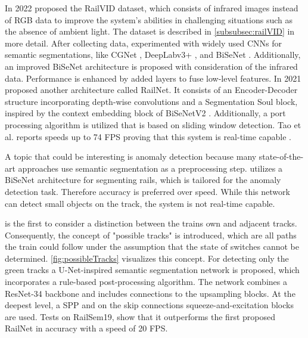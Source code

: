 In 2022 \cite{yuan2022railvid} proposed the RailVID dataset, which consists of infrared images instead of \ac{RGB} data to improve the system's abilities in challenging situations such as the absence of ambient light.
The dataset is described in \autoref{subsubsec:railVID} in more detail.
After collecting data, \cite{yuan2022railvid} experimented with widely used \ac{CNN}s for semantic segmentations, like \ac{CGNet} \cite{CGNet}, DeepLabv3+ \cite{DeepLabV3plus2018}, and \ac{BiSeNet} \cite{BiSeNet2019}.
Additionally, an improved BiSeNet architecture is proposed with consideration of the infrared data. Performance is enhanced by added layers to fuse low-level features.
In 2021 \cite{AccurateLightweightRailNet2021} proposed another architecture called RailNet.
It consists of an Encoder-Decoder structure incorporating depth-wise convolutions and a Segmentation Soul block, inspired by the context embedding block of \ac{BiSeNet}V2 \cite{BiSeNetV22021}.
Additionally, a port processing algorithm is utilized that is based on sliding window detection.
Tao et al. reports speeds up to 74 \ac{FPS} proving that this system is real-time capable \cite{AccurateLightweightRailNet2021}.

A topic that could be interesting is anomaly detection because many state-of-the-art approaches use semantic segmentation as a preprocessing step.
\cite{anomalyDetection2021} utilizes a \ac{BiSeNet} \cite{BiSeNet2019} architecture for segmenting rails, which is tailored for the anomaly detection task.
Therefore accuracy is preferred over speed.
While this network can detect small objects on the track, the system is not real-time capable.

\cite{RailraodSemanticPossibleTracks2020} is the first to consider a distinction between the trains own and adjacent tracks.
Consequently, the concept of "possible tracks" is introduced, which are all paths the train could follow under the assumption that the state of switches cannot be determined.
\autoref{fig:possibleTracks} visualizes this concept.
For detecting only the green tracks a U-Net-inspired \cite{uNet2015} semantic segmentation network is proposed, which incorporates a rule-based post-processing algorithm.
The network combines a ResNet-34 \cite{ResNet} backbone and includes connections to the upsampling blocks.
At the deepest level, a \ac{SPP} \cite{spatialPyramidPooling2014} and on the skip connections squeeze-and-excitation blocks \cite{SqueezeAndExcitation2019} are used.
Tests on RailSem19, show that it outperforms the first proposed RailNet \cite{railNet2019} in accuracy with a speed of 20 \ac{FPS}.

